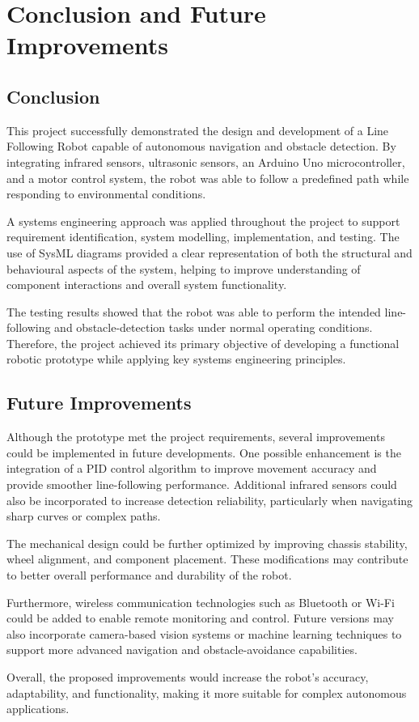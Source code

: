 \section{Conclusion and Future Improvements}
\label{sec:conclusion_future_improvements}
\subsection{Conclusion}

This project successfully demonstrated the design and development of a Line Following Robot capable of autonomous navigation and obstacle detection. By integrating infrared sensors, ultrasonic sensors, an Arduino Uno microcontroller, and a motor control system, the robot was able to follow a predefined path while responding to environmental conditions.

A systems engineering approach was applied throughout the project to support requirement identification, system modelling, implementation, and testing. The use of SysML diagrams provided a clear representation of both the structural and behavioural aspects of the system, helping to improve understanding of component interactions and overall system functionality.

The testing results showed that the robot was able to perform the intended line-following and obstacle-detection tasks under normal operating conditions. Therefore, the project achieved its primary objective of developing a functional robotic prototype while applying key systems engineering principles.

\subsection{Future Improvements}

Although the prototype met the project requirements, several improvements could be implemented in future developments. One possible enhancement is the integration of a PID control algorithm to improve movement accuracy and provide smoother line-following performance. Additional infrared sensors could also be incorporated to increase detection reliability, particularly when navigating sharp curves or complex paths.

The mechanical design could be further optimized by improving chassis stability, wheel alignment, and component placement. These modifications may contribute to better overall performance and durability of the robot.

Furthermore, wireless communication technologies such as Bluetooth or Wi-Fi could be added to enable remote monitoring and control. Future versions may also incorporate camera-based vision systems or machine learning techniques to support more advanced navigation and obstacle-avoidance capabilities.

Overall, the proposed improvements would increase the robot’s accuracy, adaptability, and functionality, making it more suitable for complex autonomous applications.
